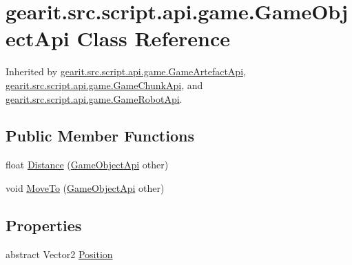 \hypertarget{classgearit_1_1src_1_1script_1_1api_1_1game_1_1_game_object_api}{\section{gearit.\+src.\+script.\+api.\+game.\+Game\+Object\+Api Class Reference}
\label{classgearit_1_1src_1_1script_1_1api_1_1game_1_1_game_object_api}
}


Inherited by \hyperlink{classgearit_1_1src_1_1script_1_1api_1_1game_1_1_game_artefact_api}{gearit.\+src.\+script.\+api.\+game.\+Game\+Artefact\+Api}, \hyperlink{classgearit_1_1src_1_1script_1_1api_1_1game_1_1_game_chunk_api}{gearit.\+src.\+script.\+api.\+game.\+Game\+Chunk\+Api}, and \hyperlink{classgearit_1_1src_1_1script_1_1api_1_1game_1_1_game_robot_api}{gearit.\+src.\+script.\+api.\+game.\+Game\+Robot\+Api}.

\subsection*{Public Member Functions}
\begin{DoxyCompactItemize}
\item 
float \hyperlink{classgearit_1_1src_1_1script_1_1api_1_1game_1_1_game_object_api_a6eef98a0d748ff313e388b6dbdcc5a7c}{Distance} (\hyperlink{classgearit_1_1src_1_1script_1_1api_1_1game_1_1_game_object_api}{Game\+Object\+Api} other)
\item 
void \hyperlink{classgearit_1_1src_1_1script_1_1api_1_1game_1_1_game_object_api_ae0249fa037cd47573cc47302c3770444}{Move\+To} (\hyperlink{classgearit_1_1src_1_1script_1_1api_1_1game_1_1_game_object_api}{Game\+Object\+Api} other)
\end{DoxyCompactItemize}
\subsection*{Properties}
\begin{DoxyCompactItemize}
\item 
abstract Vector2 \hyperlink{classgearit_1_1src_1_1script_1_1api_1_1game_1_1_game_object_api_abb4b5c17a9920fc1be3049d6a5142b06}{Position}
\end{DoxyCompactItemize}


